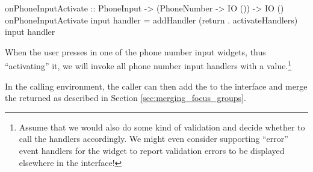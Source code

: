 \begin{haskellcode}
 onPhoneInputActivate :: PhoneInput
                      -> (PhoneNumber -> IO ()) -> IO ()
 onPhoneInputActivate input handler =
   addHandler (return . activateHandlers) input handler
\end{haskellcode}

When the user presses  in one of the phone number input
widgets, thus ``activating'' it, we will invoke all phone number input
handlers with a  value.\footnote{Assume that we would
  also do some kind of validation and decide whether to call the
  handlers accordingly.  We might even consider supporting ``error''
  event handlers for the widget to report validation errors to be
  displayed elsewhere in the interface!}

In the calling environment, the caller can then add the
 to the interface and merge the returned
 as described in Section
\ref{sec:merging_focus_groups}.
